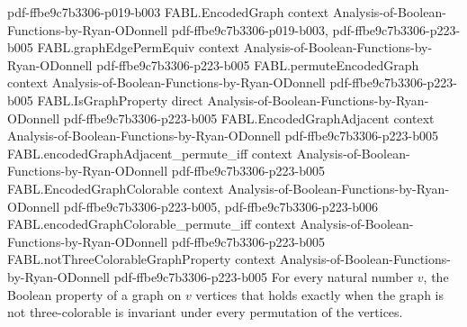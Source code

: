 \begin{theorem}
  {pdf-ffbe9c7b3306-p019-b003}
\proofstep
  {FABL.EncodedGraph}
  {context}
  {Analysis-of-Boolean-Functions-by-Ryan-ODonnell}
  {pdf-ffbe9c7b3306-p019-b003,
    pdf-ffbe9c7b3306-p223-b005}
\proofstep
  {FABL.graphEdgePermEquiv}
  {context}
  {Analysis-of-Boolean-Functions-by-Ryan-ODonnell}
  {pdf-ffbe9c7b3306-p223-b005}
\proofstep
  {FABL.permuteEncodedGraph}
  {context}
  {Analysis-of-Boolean-Functions-by-Ryan-ODonnell}
  {pdf-ffbe9c7b3306-p223-b005}
\proofstep
  {FABL.IsGraphProperty}
  {direct}
  {Analysis-of-Boolean-Functions-by-Ryan-ODonnell}
  {pdf-ffbe9c7b3306-p223-b005}
\proofstep
  {FABL.EncodedGraphAdjacent}
  {context}
  {Analysis-of-Boolean-Functions-by-Ryan-ODonnell}
  {pdf-ffbe9c7b3306-p223-b005}
\proofstep
  {FABL.encodedGraphAdjacent_permute_iff}
  {context}
  {Analysis-of-Boolean-Functions-by-Ryan-ODonnell}
  {pdf-ffbe9c7b3306-p223-b005}
\proofstep
  {FABL.EncodedGraphColorable}
  {context}
  {Analysis-of-Boolean-Functions-by-Ryan-ODonnell}
  {pdf-ffbe9c7b3306-p223-b005,
    pdf-ffbe9c7b3306-p223-b006}
\proofstep
  {FABL.encodedGraphColorable_permute_iff}
  {context}
  {Analysis-of-Boolean-Functions-by-Ryan-ODonnell}
  {pdf-ffbe9c7b3306-p223-b005}
\proofstep
  {FABL.notThreeColorableGraphProperty}
  {context}
  {Analysis-of-Boolean-Functions-by-Ryan-ODonnell}
  {pdf-ffbe9c7b3306-p223-b005}
For every natural number $v$, the Boolean property of a graph on $v$ vertices that holds
exactly when the graph is not three-colorable is invariant under every permutation of
the vertices.
\end{theorem}

